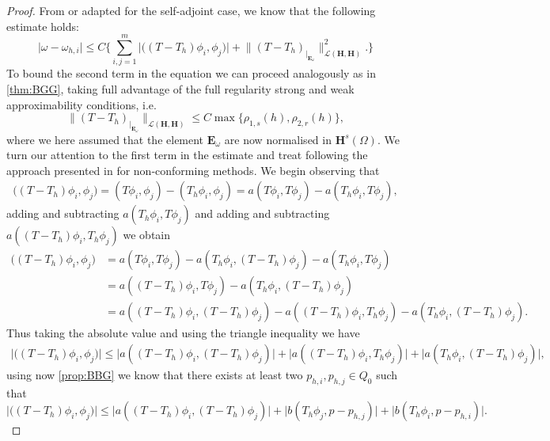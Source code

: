 \documentclass[USenglish]{article}
\theoremstyle{dgthm}
\theoremstyle{dgdef}
\let\vec\bm
\newcommand\norm[1]{\lVert#1\rVert}
\newcommand\abs[1]{\lvert#1\rvert}
\begin{document}
\begin{proof}
  From \cite[Theorem 9.7]{BoffiActa} or \cite[Theorem 7.3]{BabuskaOsborn} adapted for the self-adjoint case, we know that the following estimate holds:
  \begin{equation}
    \abs{\omega-\omega_{h,i}}\leq C 
      \Bigg\{
        \sum_{i,j=1}^{m}\abs{\Big((T-T_h)\phi_i,\phi_j\Big)} + \norm{(T-T_h)_{\big|_{\vec{E}_\omega}}}_{\mathcal{L}(\vec{H},\vec{H})}^2.
      \Bigg\}
  \end{equation}
  To bound the second term in the equation we can proceed analogously as in \cref{thm:BGG}, taking full advantage of the full regularity strong and weak approximability conditions, i.e.
  \begin{equation}
    \norm{(T-T_h)_{\big|_{\vec{E}_\omega}}}_{\mathcal{L}(\vec{H},\vec{H})}\leq C \max\{\rho_{1,s}(h),\rho_{2,r}(h)\},\label{eq:secondTerm}
  \end{equation}
  where we here assumed that the element $\vec{E}_\omega$ are now normalised in $\vec{H}^s(\Omega)$.
  We turn our attention to the first term in the estimate and treat following the approach presented in \cite{BoffiActa} for non-conforming methods.
  We begin observing that
  \begin{align}
    \Big((T-T_h)\phi_i,\phi_j\Big) = (T\phi_i,\phi_j) - (T_h\phi_i,\phi_j) = a(T\phi_i,T\phi_j) - a(T_h\phi_i,T\phi_j),
  \end{align}
  adding and subtracting $a(T_h\phi_i,T\phi_j)$ and adding and subtracting $a((T-T_h)\phi_i,T_h \phi_j)$ we obtain
  \begin{align}
    \Big((T-T_h)\phi_i,\phi_j\Big) &= a(T\phi_i,T\phi_j) - a(T_h\phi_i, (T-T_h)\phi_j) - a(T_h\phi_i,T\phi_j)\\
    &= a((T-T_h)\phi_i,T\phi_j) - a(T_h\phi_i,(T-T_h)\phi_j)\\
    &= a((T-T_h)\phi_i,(T-T_h)\phi_j) - a((T-T_h)\phi_i,T_h\phi_j) - a(T_h\phi_i,(T-T_h)\phi_j).
  \end{align}
  Thus taking the absolute value and using the triangle inequality we have
  \begin{align}
    \abs{\Big((T-T_h)\phi_i,\phi_j\Big)} \leq \abs{a((T-T_h)\phi_i,(T-T_h)\phi_j)} +\abs{a((T-T_h)\phi_i,T_h\phi_j)} +\abs{a(T_h\phi_i,(T-T_h)\phi_j)},
  \end{align}
  using now \cref{prop:BBG} we know that there exists at least two $p_{h,i},p_{h,j}\in Q_0$ such that
  \begin{equation}
    \abs{\Big((T-T_h)\phi_i,\phi_j\Big)} \leq \abs{a((T-T_h)\phi_i,(T-T_h)\phi_j)} +\abs{b(T_h\phi_j,p-p_{h,j})} +\abs{b(T_h\phi_i,p-p_{h,i})}.

\end{equation}
\end{proof}
\end{document}

